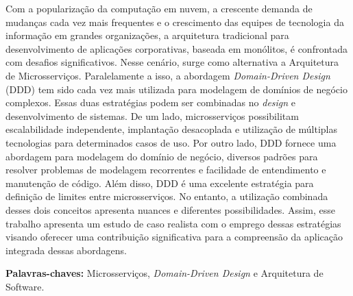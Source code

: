 \begin{resumo}



Com a popularização da computação em nuvem, a crescente demanda de mudanças cada vez mais frequentes e o crescimento das equipes de tecnologia da informação em grandes organizações, a arquitetura tradicional para desenvolvimento de aplicações corporativas, baseada em monólitos, é confrontada com desafios significativos. Nesse cenário, surge como alternativa a Arquitetura de Microsserviços. Paralelamente a isso, a abordagem \textit{Domain-Driven Design} (DDD) tem sido cada vez mais utilizada para modelagem de domínios de negócio complexos. Essas duas estratégias podem ser combinadas no \textit{design} e desenvolvimento de sistemas. De um lado, microsserviços possibilitam escalabilidade independente, implantação desacoplada e utilização de múltiplas tecnologias para determinados casos de uso. Por outro lado, DDD fornece uma abordagem para modelagem do domínio de negócio, diversos padrões para resolver problemas de modelagem recorrentes e facilidade de entendimento e manutenção de código. Além disso, DDD é uma excelente estratégia para definição de limites entre microsserviços. No entanto, a utilização combinada desses dois conceitos apresenta nuances e diferentes possibilidades. Assim, esse trabalho apresenta um estudo de caso realista com o emprego dessas estratégias visando oferecer uma contribuição significativa para a compreensão da aplicação integrada dessas abordagens.

\textbf{Palavras-chaves: } Microsserviços, \textit{Domain-Driven Design} e Arquitetura de Software.  

\end{resumo}


